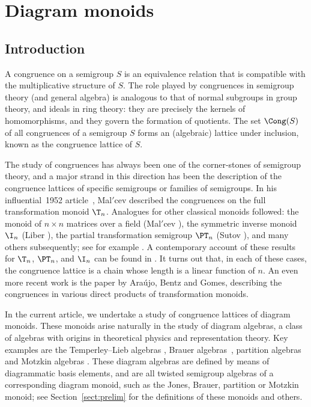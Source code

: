 \chapter{Diagram monoids}
\label{chap:motzkin}

\section{Introduction}\label{sec:intro}
A {congruence} on a semigroup $S$ is an equivalence relation that is
compatible with the multiplicative structure of $S$.  The role played by
congruences in semigroup theory (and general algebra) is analogous to that of
normal subgroups in group theory, and ideals in ring theory: they are precisely the kernels of
homomorphisms, and they govern the formation of quotients.  The set $\Cong(S)$
of all congruences of a semigroup $S$ forms an (algebraic) lattice under
inclusion, known as the {congruence lattice} of $S$.  

The study of
congruences has always been one of the corner-stones of semigroup theory, and a
major strand in this direction has been the description of the congruence
lattices of specific semigroups or families of semigroups.
%
In his influential~1952 article~\cite{Malcev1952}, Mal$'$cev described the
congruences on the full transformation  monoid $\T_n$.  Analogues for other
classical monoids followed: the monoid of $n\times n$ matrices over a
field (Mal$'$cev \cite{Malcev1953}), the symmetric inverse monoid $\I_n$ (Liber
\cite{Liber1953}), the partial transformation semigroup $\PT_n$ (Sutov \cite{Sutov1961}), and many
others subsequently; see for example \cite{Aizenstat1962,Fernandes2001,MSS2000,Sutov1961_2}.
%
A contemporary account of these results for $\T_n$, $\PT_n$,
and $\I_n$ can be found in \cite[Section 6.3]{GMbook}.  It turns out that,
in each of these cases, the congruence lattice is a chain whose length is a
linear function of $n$.  An even more recent work is the paper
\cite{ABG2016} by Ara\'{u}jo, Bentz and Gomes, describing the congruences in
various direct products of transformation monoids.  

In the current article, we undertake a study of congruence lattices of
{diagram monoids}.  These monoids arise naturally in the study of
{diagram algebras}, a class of algebras with origins in theoretical
physics and representation theory. Key examples are the
{Temperley--Lieb algebras} \cite{TL1971,Martin1994,BDP2002}, 
{Brauer algebras}~\cite{Brauer1937,MarMaz2014},
{partition algebras} \cite{Martin1994,Jones1994_2,HR2005}
and {Motzkin algebras} \cite{BH2014}.  
These diagram algebras are defined by means of diagrammatic basis elements, and
are all {twisted semigroup algebras} \cite{Wilcox2007} of a corresponding
diagram monoid, such as the {Jones},
{Brauer}, {partition} or {Motzkin monoid}; see
Section~\ref{sect:prelim} for the definitions of these monoids and others. 

